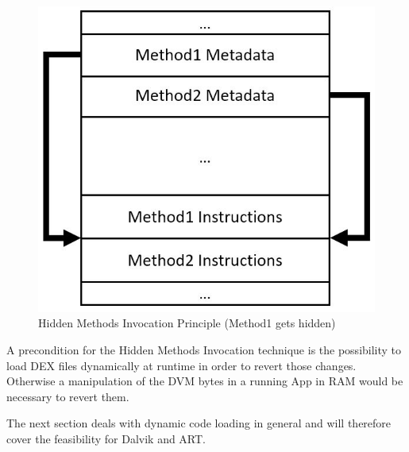 \begin{figure}[htb]
  \centering
  \includegraphics[scale=0.4]{figures/hidden_method_invocation}
  \caption[Hidden Methods Invocation]{Hidden Methods Invocation Principle (Method1 gets hidden)}
  \label{fig:hidden_method_invocation}
\end{figure}

A precondition for the Hidden Methods Invocation technique is the
possibility to load DEX files dynamically at runtime in order to revert
those changes. Otherwise a manipulation of the DVM bytes in a running App in RAM would be necessary to revert them.

The next section deals with dynamic
code loading in general and will therefore cover the feasibility for Dalvik
and ART.

